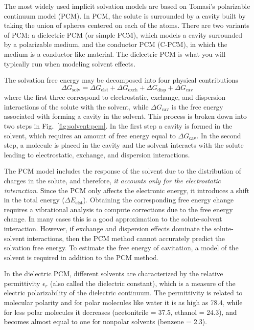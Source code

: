 \documentclass[../Main/chem371-notes.tex]{subfiles}
\begin{document}
The most widely used implicit solvation models are based on Tomasi's polarizable continuum model (PCM).
In PCM, the solute is surrounded by a cavity built by taking the union of spheres centered on each of the atoms.
There are two variants of PCM: a dielectric PCM (or simple PCM), which models a cavity surrounded by a polarizable medium, and the conductor PCM (C-PCM), in which the medium is a conductor-like material.
The dielectric PCM is what you will typically run when modeling solvent effects.

The solvation free energy may be decomposed into four physical contributions
\begin{equation}
\Delta G_\mathrm{solv}= \Delta G_\mathrm{elst} + \Delta G_\mathrm{exch} + \Delta G_\mathrm{disp} + \Delta G_\mathrm{cav}
\end{equation}
where the first three correspond to electrostatic, exchange, and dispersion interactions of the solute with the solvent, while $\Delta G_\mathrm{cav}$ is the free energy associated with forming a cavity in the solvent.
This process is broken down into two steps in Fig.~\ref{fig:solvent:pcm}.
In the first step a cavity is formed in the solvent, which requires an amount of free energy equal to $\Delta G_\mathrm{cav}$.
In the second step, a molecule is placed in the cavity and the solvent interacts with the solute leading to electrostatic, exchange, and dispersion interactions.

The PCM model includes the response of the solvent due to the distribution of charges in the solute, and therefore, \emph{it accounts only for the electrostatic interaction}.
Since the PCM only affects the electronic energy, it introduces a shift in the total energy ($\Delta E_\mathrm{elst}$).
Obtaining the corresponding free energy change requires a vibrational analysis to compute corrections due to the free energy change.
In many cases this is a good approximation to the solute-solvent interaction.
However, if exchange and dispersion effects dominate the solute-solvent interactions, then the PCM method cannot accurately predict the solvation free energy.
To estimate the free energy of cavitation, a model of the solvent is required in addition to the PCM method.

In the dielectric PCM, different solvents are characterized by the relative permittivity $\epsilon_r$ (also called the dielectric constant), which is a measure of the electric polarizability of the dielectric continuum. The permittivity is related to molecular polarity and for polar molecules like water it is as high as 78.4, while for less polar molecules it decreases (acetonitrile = 37.5, ethanol = 24.3), and becomes almost equal to one for nonpolar solvents (benzene = 2.3).
\end{document}
